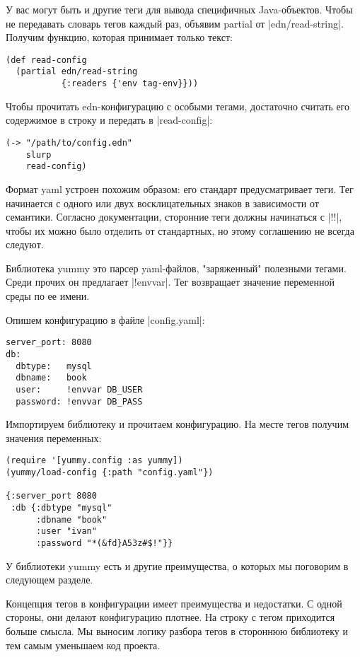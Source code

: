 У вас могут быть и другие теги для вывода специфичных Java-объектов. Чтобы не
передавать словарь тегов каждый раз, объявим partial от
\spverb|edn/read-string|. Получим функцию, которая принимает только текст:

\begin{verbatim}
(def read-config
  (partial edn/read-string
           {:readers {'env tag-env}}))
\end{verbatim}

Чтобы прочитать edn-конфигурацию с особыми тегами, достаточно считать его
содержимое в строку и передать в \spverb|read-config|:

\begin{verbatim}
(-> "/path/to/config.edn"
    slurp
    read-config)
\end{verbatim}

Формат yaml устроен похожим образом: его стандарт предусматривает теги. Тег
начинается с одного или двух восклицательных знаков в зависимости от
семантики. Согласно документации, сторонние теги должны начинаться с \spverb|!!|, чтобы
их можно было отделить от стандартных, но этому соглашению не всегда следуют.

Библиотека yummy это парсер yaml-файлов, "заряженный" полезными тегами. Среди
прочих он предлагает \spverb|!envvar|. Тег возвращает значение переменной среды по ее
имени.

Опишем конфигурацию в файле \spverb|config.yaml|:

\begin{verbatim}
server_port: 8080
db:
  dbtype:   mysql
  dbname:   book
  user:     !envvar DB_USER
  password: !envvar DB_PASS
\end{verbatim}

Импортируем библиотеку и прочитаем конфигурацию. На месте тегов получим значения
переменных:

\begin{verbatim}
(require '[yummy.config :as yummy])
(yummy/load-config {:path "config.yaml"})

{:server_port 8080
 :db {:dbtype "mysql"
      :dbname "book"
      :user "ivan"
      :password "*(&fd}A53z#$!"}}
\end{verbatim}

У библиотеки yummy есть и другие преимущества, о которых мы поговорим в
следующем разделе.

Концепция тегов в конфигурации имеет преимущества и недостатки. С одной стороны,
они делают конфигурацию плотнее. На строку с тегом приходится больше смысла. Мы
выносим логику разбора тегов в стороннюю библиотеку и тем самым уменьшаем код
проекта.

